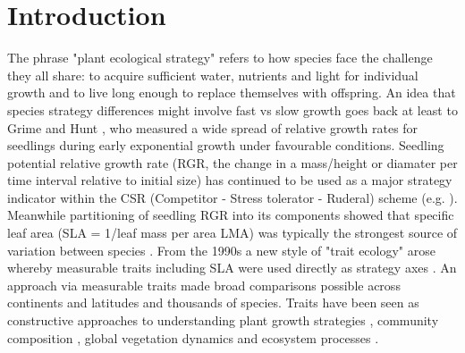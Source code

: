 \documentclass[a4paper]{article}\usepackage[]{graphicx}\usepackage[]{color}
\begin{document}
\section*{Introduction}\label{introduction}
The phrase "plant ecological strategy" refers to how species face the challenge they all share:  to acquire sufficient water, nutrients and light for individual growth and to live long enough to replace themselves with offspring. An idea that species strategy differences might involve fast vs slow growth goes back at least to Grime and Hunt \citeyearpar{Grime:1975gr}, who measured a wide spread of relative growth rates for seedlings during early exponential growth under favourable conditions. Seedling potential relative growth rate (RGR, the change in a mass/height or diamater per time interval relative to initial size) has continued to be used as a major strategy indicator within the CSR (Competitor - Stress tolerator - Ruderal) scheme (e.g. \citealt{grime1979plant, Grime:1997wm}). Meanwhile partitioning of seedling RGR into its components showed that specific leaf area (SLA = 1/leaf mass per area LMA) was typically the strongest source of variation between species \citep{Poorter:1989tx}. From the 1990s a new style of "trait ecology" arose whereby measurable traits including SLA were used directly as strategy axes \citep{Westoby:2002ft}. An approach via measurable traits made broad comparisons possible across continents and latitudes and thousands of species. Traits have been seen as constructive approaches to understanding plant growth strategies \citep{Grime:1977kc,Chapin:1980gz}, community composition \citep{Lavorel:2002ff,Shipley:2006ie}, global vegetation dynamics \citep{Scheiter:2013ed} and ecosystem processes \citep{Lavorel:2002ff}.
\end{document}

